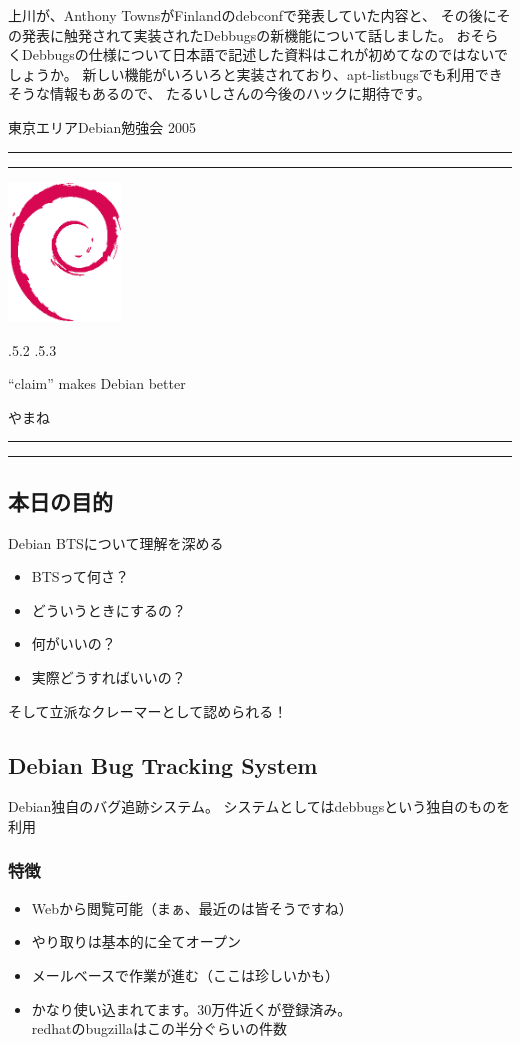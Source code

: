 \documentclass[mingoth,a4paper]{jsarticle}
\makeatletter
\renewcommand{\section}{\@startsection{section}{1}{\z@}%
    {\Cvs \@plus.5\Cdp \@minus.2\Cdp}%
    {.5\Cvs \@plus.3\Cdp}%
    {\normalfont\Large\headfont\raggedright\centering}} %
\newcommand{\dancersection}[2]{%
\newpage
東京エリアDebian勉強会 2005
\hrule
\vspace{0.5mm}
\hrule
\hfill{}\includegraphics[width=3cm]{image200502/openlogo-nd.eps}\\
\vspace{-4cm}
\begin{center}
  \section{#1}
\end{center}
\hfill{}#2\hspace{3cm}\space\\
\hrule
\hrule
\vspace{1cm}
}
\makeatother
\begin{document}
上川が、Anthony TownsがFinlandのdebconfで発表していた内容と、
その後にその発表に触発されて実装されたDebbugsの新機能について話しました。
おそらくDebbugsの仕様について日本語で記述した資料はこれが初めてなのではないでしょうか。
新しい機能がいろいろと実装されており、apt-listbugsでも利用できそうな情報もあるので、
たるいしさんの今後のハックに期待です。


\dancersection{``claim'' makes Debian better}
{やまね}
\label{sec:yamane}

\subsection{本日の目的}

Debian BTSについて理解を深める

\begin{itemize}
\item BTSって何さ？
\item どういうときにするの？
\item 何がいいの？
\item 実際どうすればいいの？
\end{itemize}

そして立派なクレーマーとして認められる！

\subsection{Debian Bug Tracking System}

Debian独自のバグ追跡システム。
システムとしてはdebbugsという独自のものを利用

\subsubsection*{特徴}

\begin{itemize}
\item Webから閲覧可能（まぁ、最近のは皆そうですね）
\item やり取りは基本的に全てオープン
\item メールベースで作業が進む（ここは珍しいかも）
\item かなり使い込まれてます。30万件近くが登録済み。\\
redhatのbugzillaはこの半分ぐらいの件数
\end{itemize}
\end{document}

